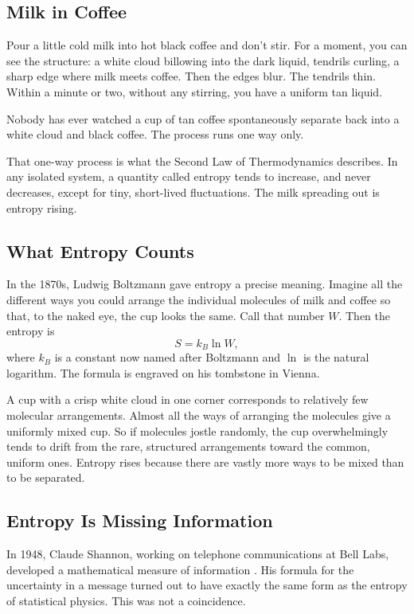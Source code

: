 \subsection{Milk in Coffee}

Pour a little cold milk into hot black coffee and don't stir. For a moment, you can see the structure: a white cloud billowing into the dark liquid, tendrils curling, a sharp edge where milk meets coffee. Then the edges blur. The tendrils thin. Within a minute or two, without any stirring, you have a uniform tan liquid.

Nobody has ever watched a cup of tan coffee spontaneously separate back into a white cloud and black coffee. The process runs one way only.

That one-way process is what the Second Law of Thermodynamics describes. In any isolated system, a quantity called entropy tends to increase, and never decreases, except for tiny, short-lived fluctuations. The milk spreading out is entropy rising.

\subsection{What Entropy Counts}

In the 1870s, Ludwig Boltzmann gave entropy a precise meaning. Imagine all the different ways you could arrange the individual molecules of milk and coffee so that, to the naked eye, the cup looks the same. Call that number \(W\). Then the entropy is
\[
S = k_B \ln W,
\]
where \(k_B\) is a constant now named after Boltzmann and \(\ln\) is the natural logarithm. The formula is engraved on his tombstone in Vienna.

A cup with a crisp white cloud in one corner corresponds to relatively few molecular arrangements. Almost all the ways of arranging the molecules give a uniformly mixed cup. So if molecules jostle randomly, the cup overwhelmingly tends to drift from the rare, structured arrangements toward the common, uniform ones. Entropy rises because there are vastly more ways to be mixed than to be separated.

\subsection{Entropy Is Missing Information}

In 1948, Claude Shannon, working on telephone communications at Bell Labs, developed a mathematical measure of information \cite{shannon1948}. His formula for the uncertainty in a message turned out to have exactly the same form as the entropy of statistical physics. This was not a coincidence.

